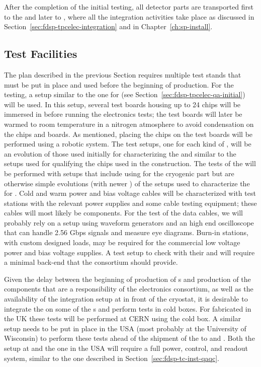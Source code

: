 After the completion of the initial  testing, all detector 
parts are transported first to the  and later to , 
where all the integration activities take place as discussed in
Section~\ref{sec:fdsp-tpcelec-integration} and in Chapter~\ref{ch:sp-install}.

\subsection{Test Facilities}
\label{sec:fdsp-tpcelec-production-facilities}

The  plan described in the previous Section requires
multiple test stands that must be put in place and used 
before the beginning of production. For the 
testing, a setup similar to the one for  (see
Section~\ref{sec:fdsp-tpcelec-qa-initial}) will
be used. In this setup, several test boards housing up to 24
chips will be immersed in \lntwo before running the
electronics tests; the test boards will later be warmed to room temperature in 
a nitrogen atmosphere to avoid condensation on the chips and
boards. As mentioned, placing the chips on the test 
boards will be performed using a robotic system. The test setups,
one for each kind of , will be an evolution of those
used initially for characterizing the  and similar
to the setups used for qualifying the chips used in the 
construction. The tests of the  will be performed with
setups that include using  for the cryogenic part
but are otherwise simple evolutions (with newer )
of the setups used to characterize the 
for . Cold and warm power and bias voltage cables will
be characterized with test stations with the relevant 
power supplies and some cable testing equipment; these cables will most
likely be  components.
For the test of the data cables, we will probably rely on a setup
using waveform generators and an high end oscilloscope that 
can handle 2.56 Gbps signals and measure eye diagrams. 
Burn-in stations, with custom designed loads, may be required for 
the commercial low voltage power and bias voltage supplies.
A test setup to check  with their 
and  will require a minimal  back-end that the
 consortium should provide.

Given the delay between the beginning of production of 
s and production of the components that are a responsibility of
the  electronics consortium, as well as the availability of the
integration setup at  in front of the cryostat, it is
desirable to integrate the  on some of the s 
and perform tests in cold boxes. For  fabricated in the UK
these tests will be performed at CERN using the  cold box.
A similar setup needs to be put in place in the USA (most probably at 
the University of Wisconsin) to perform these tests ahead of the shipment of the  to 
 and . Both the setup at  and
the one in the USA will require a full power, control, and readout system, similar
to the one described in Section~\ref{sec:fdsp-tc-inst-qaqc}.
